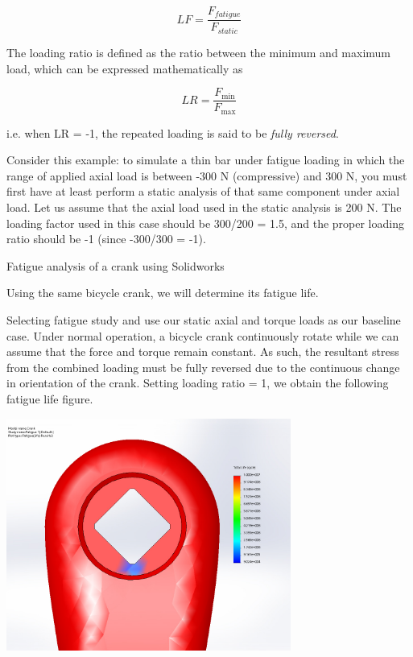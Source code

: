 \documentclass[a4paper,openany,nobib]{tufte-book}
\begin{document}
{{$$LF = \frac{F_{fatigue}}{F_{static}}$$

The loading ratio is defined as the ratio between the minimum and
maximum load, which can be expressed mathematically as

$$LR = \frac{F_{\min}}{F_{\max }}$$

i.e. when LR = -1, the repeated loading is said to be \emph{fully reversed}.

Consider this example: to simulate a thin bar under fatigue loading in
which the range of applied axial load is between -300 N (compressive)
and 300 N, you must first have at least perform a static analysis of
that same component under axial load. Let us assume that the axial load
used in the static analysis is 200 N. The loading factor used in this
case should be 300/200 = 1.5, and the proper loading ratio should be -1
(since -300/300 = -1).

Fatigue analysis of a crank using Solidworks

Using the same bicycle crank, we will determine its fatigue life.

Selecting fatigue study and use our static axial and torque loads as our
baseline case. Under normal operation, a bicycle crank continuously
rotate while we can assume that the force and torque remain constant. As
such, the resultant stress from the combined loading must be fully
reversed due to the continuous change in orientation of the crank.
Setting loading ratio = 1, we obtain the following fatigue life figure.

\begin{center}
\includegraphics[width=0.7\textwidth]{pictures/Intro-CAD/Crank-fatigue-front.jpg}
\end{center}

}}
\end{document}
